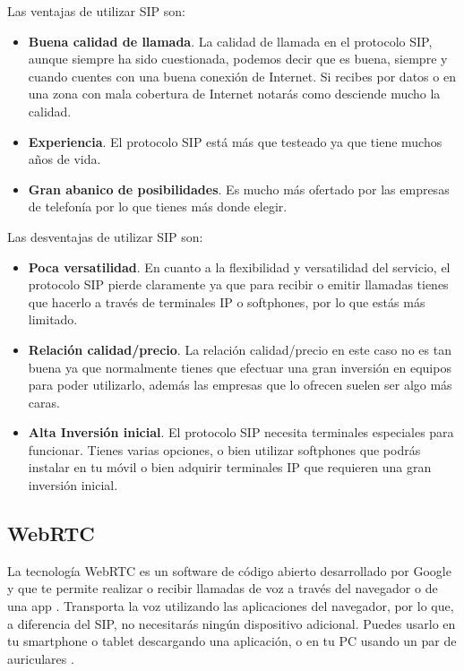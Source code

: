 Las ventajas de utilizar SIP son:

\begin{itemize}
  \item \textbf{Buena calidad de llamada}. La calidad de llamada en el protocolo SIP, aunque siempre ha sido cuestionada, podemos decir que es buena, siempre y cuando cuentes con una buena conexión de Internet. Si recibes por datos o en una zona con mala cobertura de Internet notarás como desciende mucho la calidad.
  \item \textbf{Experiencia}. El protocolo SIP está más que testeado ya que tiene muchos años de vida.
  \item \textbf{Gran abanico de posibilidades}. Es mucho más ofertado por las empresas de telefonía por lo que tienes más donde elegir.
\end{itemize}

Las desventajas de utilizar SIP son:

\begin{itemize}
  \item \textbf{Poca versatilidad}. En cuanto a la flexibilidad y versatilidad del servicio, el protocolo SIP pierde claramente ya que para recibir o emitir llamadas tienes que hacerlo a través de terminales IP o softphones, por lo que estás más limitado.
  \item \textbf{Relación calidad/precio}. La relación calidad/precio en este caso no es tan buena ya que normalmente tienes que efectuar una gran inversión en equipos para poder utilizarlo, además las empresas que lo ofrecen suelen ser algo más caras.
  \item \textbf{Alta Inversión inicial}. El protocolo SIP necesita terminales especiales para funcionar. Tienes varias opciones, o bien utilizar softphones que podrás instalar en tu móvil o bien adquirir terminales IP que requieren una gran inversión inicial.
\end{itemize}

\subsection{WebRTC}

La tecnología WebRTC es un software de código abierto desarrollado por Google y que te permite realizar o recibir llamadas de voz a través del navegador o de una app \cite{webrtc1}. Transporta la voz utilizando las aplicaciones del navegador, por lo que, a diferencia del SIP, no necesitarás ningún dispositivo adicional. Puedes usarlo en tu smartphone o tablet descargando una aplicación, o en tu PC usando un par de auriculares \cite{webrtc2}.


